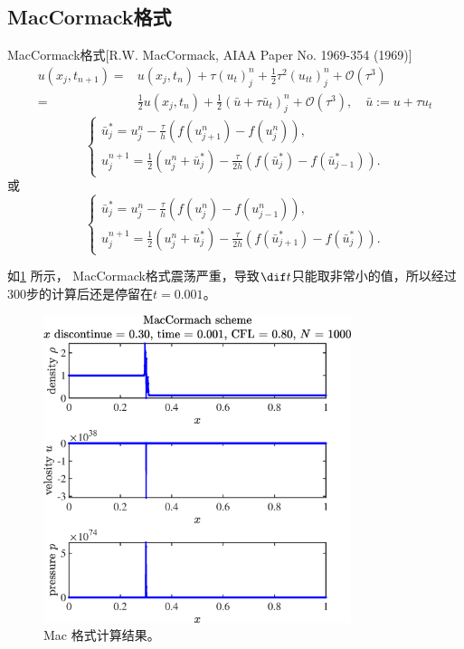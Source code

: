 \documentclass[12pt]{article}
\begin{document}
\subsection{MacCormack格式}

MacCormack格式[R.W. MacCormack, AIAA Paper No. 1969-354 (1969)]
\begin{equation}
	\begin{aligned}
		u\left(x_{j}, t_{n+1}\right)= & u\left(x_{j}, t_{n}\right)+\tau\left(u_{t}\right)_{j}^{n}+\frac{1}{2} \tau^{2}\left(u_{t t}\right)_{j}^{n}+\mathcal{O}\left(\tau^{3}\right)                   \\
		=                             & \frac{1}{2} u\left(x_{j}, t_{n}\right)+\frac{1}{2}\left(\bar{u}+\tau \bar{u}_{t}\right)_{j}^{n}+\mathcal{O}\left(\tau^{3}\right), \quad \bar{u}:=u+\tau u_{t}
	\end{aligned}
\end{equation}
\begin{equation}
	\left\{\begin{array}{l}
		\bar{u}_{j}^{*}=u_{j}^{n}-\frac{\tau}{h}\left(f\left(u_{j+1}^{n}\right)-f\left(u_{j}^{n}\right)\right), \\
		u_{j}^{n+1}=\frac{1}{2}\left(u_{j}^{n}+\bar{u}_{j}^{*}\right)-\frac{\tau}{2 h}\left(f\left(\bar{u}_{j}^{*}\right)-f\left(\bar{u}_{j-1}^{*}\right)\right).
	\end{array}\right.
\end{equation}
或
\begin{equation}
	\left\{\begin{array}{l}
		\bar{u}_{j}^{*}=u_{j}^{n}-\frac{\tau}{h}\left(f\left(u_{j}^{n}\right)-f\left(u_{j-1}^{n}\right)\right), \\
		u_{j}^{n+1}=\frac{1}{2}\left(u_{j}^{n}+\bar{u}_{j}^{*}\right)-\frac{\tau}{2 h}\left(f\left(\bar{u}_{j+1}^{*}\right)-f\left(\bar{u}_{j}^{*}\right)\right).
	\end{array}\right.
\end{equation}

如\cref{fig:2Mac} 所示， MacCormack格式震荡严重，导致$\dif t$只能取非常小的值，所以经过$300$步的计算后还是停留在$t=0.001$。

\begin{figure}[htp]
	\centering
	\includegraphics[width=9cm]{2Mac.eps}
	\vspace{20pt}
	\caption{Mac 格式计算结果。}
	\label{fig:2Mac}
\end{figure}
\end{document}
